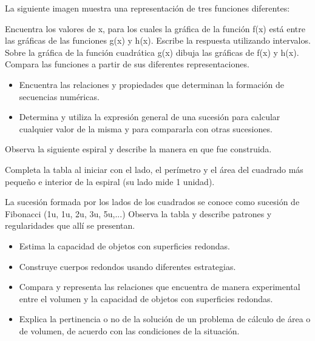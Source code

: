 \ejemplo

La siguiente imagen muestra una representación de tres funciones diferentes:


Encuentra los valores de x, para los cuales la gráfica de la función f(x) está entre las gráficas de las funciones g(x) y h(x). Escribe la respuesta utilizando intervalos. Sobre la gráfica de la función cuadrática g(x) dibuja las gráficas de f(x) y h(x). Compara las funciones a partir de sus diferentes representaciones.


\evidencias

\begin{itemize}
  \item Encuentra las relaciones y propiedades que determinan la formación de secuencias numéricas.
  \item Determina y utiliza la expresión general de una sucesión para calcular cualquier valor de la misma y para compararla con otras sucesiones.
\end{itemize}

\ejemplo

Observa la siguiente espiral y describe la manera en que fue construida.


Completa la tabla al iniciar con el lado, el perímetro y el área del cuadrado más pequeño e interior de la espiral (su lado mide 1 unidad).


La sucesión formada por los lados de los cuadrados se conoce como sucesión de Fibonacci (1u, 1u, 2u, 3u, 5u,...) Observa la tabla y describe patrones y regularidades que allí se presentan.


\evidencias

\begin{itemize}
  \item Estima la capacidad de objetos con superficies redondas.
  \item Construye cuerpos redondos usando diferentes estrategias.
  \item Compara y representa las relaciones que encuentra de manera experimental entre el volumen y la capacidad de objetos con superficies redondas.
  \item Explica la pertinencia o no de la solución de un problema de cálculo de área o de volumen, de acuerdo con las condiciones de la situación.
\end{itemize}

